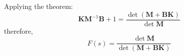 Applying the theorem:
\[
\mathbf{KM}^{-1}\mathbf{B}+1=\frac{\det\left(\mathbf{M}+\mathbf{BK}\right)}{\det{\mathbf{M}}}
\]
therefore,
\[
F(s) = \frac{\det\mathbf{M}}{\det\left(\mathbf{M}+\mathbf{BK}\right)}
\]


\endinput

